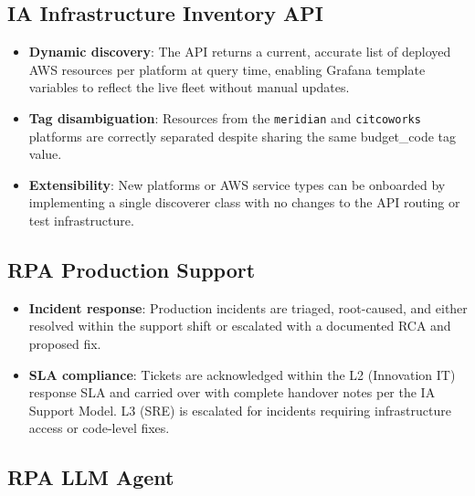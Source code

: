 \subsection{IA Infrastructure Inventory API}

\begin{itemize}
    \item \textbf{Dynamic discovery}: The API returns a current,
          accurate list of deployed AWS resources per platform at query
          time, enabling Grafana template variables to reflect the live
          fleet without manual updates.

    \item \textbf{Tag disambiguation}: Resources from the
          \texttt{meridian} and \texttt{citcoworks} platforms are
          correctly separated despite sharing the same budget\_code
          tag value.

    \item \textbf{Extensibility}: New platforms or AWS service types
          can be onboarded by implementing a single discoverer class
          with no changes to the API routing or test infrastructure.
\end{itemize}

\subsection{RPA Production Support}

\begin{itemize}
    \item \textbf{Incident response}: Production incidents are triaged,
          root-caused, and either resolved within the support shift or
          escalated with a documented RCA and proposed fix.

    \item \textbf{SLA compliance}: Tickets are acknowledged within the
          L2 (Innovation IT) response SLA and carried over with complete
          handover notes per the IA Support Model. L3 (SRE) is escalated
          for incidents requiring infrastructure access or code-level fixes.
\end{itemize}


\subsection{RPA LLM Agent}

